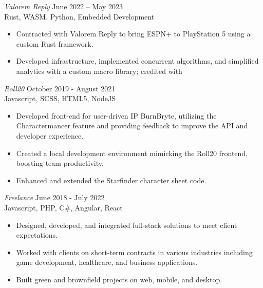 \documentclass[10pt]{
	res
} %
\begin{document}
\begin{resume}
		\vspace{4pt}
		{\sl Valorem Reply} \hfill June 2022 -- May 2023 \\ Rust, WASM, Python, Embedded
		Development
		\begin{itemize}
			\itemsep -2pt %

			\item Contracted with Valorem Reply to bring ESPN+ to PlayStation 5 using
				a custom Rust framework.

			\item Developed infrastructure, implemented concurrent algorithms, and simplified
				analytics with a custom macro library; credited with 
		\end{itemize}

		\vspace{4pt}
		{\sl Roll20} \hfill October 2019 - August 2021 \\ Javascript, SCSS, HTML5, NodeJS
		\begin{itemize}
			\itemsep -2pt %

			\item Developed front-end for user-driven IP BurnBryte, utilizing the
				Charactermancer feature and providing feedback to improve the API and
				developer experience.

			\item Created a local development environment mimicking the Roll20 frontend,
				boosting team productivity.

			\item Enhanced and extended the Starfinder character sheet code.
		\end{itemize}

		\vspace{4pt}
		{\sl Freelance} \hfill June 2018 - July 2022 \\ Javascript, PHP, C\#,
		Angular, React
		\begin{itemize}
			\itemsep -2pt %

			\item Designed, developed, and integrated full-stack solutions to meet client
				expectations.

			\item Worked with clients on short-term contracts in various industries including
				game development, healthcare, and business applications.

			\item Built green and brownfield projects on web, mobile, and desktop.
		\end{itemize}


\end{resume}
\end{document}
